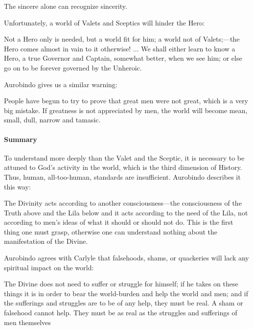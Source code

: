 \begin{quotex}
The sincere alone can recognize sincerity.
\end{quotex}


Unfortunately, a world of Valets and Sceptics will hinder the Hero:

\begin{quotex}
Not a Hero only is needed, but a world fit for him; a world not of Valets;---the Hero comes almost in vain to it otherwise! ... We shall either learn to know a Hero, a true Governor and Captain, somewhat better, when we see him; or else go on to be forever governed by the Unheroic.
\end{quotex}


Aurobindo gives us a similar warning:

\begin{quotex}
People have begun to try to prove that great men were not great, which is a very big mistake. If greatness is not appreciated by men, the world will become mean, small, dull, narrow and tamasic.
\end{quotex}


\paragraph{Summary}


To understand more deeply than the Valet and the Sceptic, it is necessary to be attuned to God's activity in the world, which is the third dimension of History. Thus, human, all-too-human, standards are insufficient. Aurobindo describes it this way:

\begin{quotex}
The Divinity acts according to another consciousness---the consciousness of the Truth above and the Lila below and it acts according to the need of the Lila, not according to men's ideas of what it should or should not do. This is the first thing one must grasp, otherwise one can understand nothing about the manifestation of the Divine.
\end{quotex}


Aurobindo agrees with Carlyle that falsehoods, shams, or quackeries will lack any spiritual impact on the world:

\begin{quotex}
The Divine does not need to suffer or struggle for himself; if he takes on these things it is in order to bear the world-burden and help the world and men; and if the sufferings and struggles are to be of any help, they must be real. A sham or falsehood cannot help. They must be as real as the struggles and sufferings of men themselves
\end{quotex}


